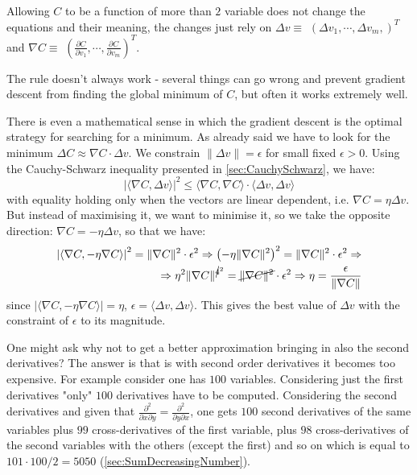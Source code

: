 \documentclass[12pt, letterpaper]{article}
\theoremstyle{definition}
\begin{document}
Allowing $C$ to be a function of more than $2$ variable does not change the equations and their meaning, the changes just rely on $\Delta v \equiv $ $\left( \Delta v_1, \cdots, \Delta v_m, \right)^T$ and $\nabla C \equiv$ $\left( \frac{\partial C}{\partial v_1}, \cdots, \frac{\partial C}{\partial v_m}\right)^T$.

The rule doesn't always work - several things can go wrong and prevent gradient descent from finding the global minimum of $C$, but often it works extremely well.

There is even a mathematical sense in which the gradient descent is the optimal strategy for searching for a minimum. As already said we have to look for the minimum $\Delta C \approx \nabla C  \cdot \Delta v$. We constrain $\| \Delta v \| = \epsilon$ for small fixed  $\epsilon > 0$. Using the Cauchy-Schwarz inequality presented in \autoref{sec:CauchySchwarz}, we have:
\begin{equation}
\left| \langle \nabla C, \Delta v \rangle \right|^2 \le \langle \nabla C, \nabla C \rangle\cdot \langle \Delta v, \Delta v \rangle 
\end{equation}
with equality holding only when  the vectors are linear dependent, i.e. $\nabla C = \eta \Delta v$. But instead of maximising it, we want to minimise it, so we take the opposite direction: $\nabla C = -\eta \Delta v$, so that we have:
\begin{equation}
\begin{aligned}
\left| \langle  \nabla C, -\eta  \nabla C \rangle \right|^2 = \|\nabla C\|^2 \cdot \epsilon^2 
\Rightarrow \left( -\eta \|\nabla C\|^2\right)^2 =\|\nabla C\|^2 \cdot \epsilon^2 \Rightarrow \\
\Rightarrow \eta^2 \|\nabla C\|^{\cancel{4}^2} = \cancel{\|\nabla C\|^2} \cdot \epsilon^2
\Rightarrow \eta = \frac{\epsilon}{\|\nabla C\|}
\end{aligned}
\end{equation}
since $\left| \langle  \nabla C, -\eta  \nabla C \rangle \right| = \eta $, $\epsilon = \langle \Delta v, \Delta v \rangle $. This gives the best value of $\Delta v$ with the constraint of $\epsilon$ to its magnitude.

One might ask why not to get a better approximation bringing in also the second derivatives? The answer is that is with second order derivatives it becomes too expensive. For example consider one has $100$ variables. Considering just the first derivatives "only" $100$ derivatives have to be computed. Considering the second derivatives and given that $\frac{\partial^2}{\partial x \partial y} =  \frac{\partial^2}{ \partial y\partial x}$, one gets $100$ second derivatives of the same variables plus $99$ cross-derivatives of the first variable, plus $98$ cross-derivatives of the second variables with the others (except the first) and so on which is equal to $101\cdot 100 /2 = 5050$ (\autoref{sec:SumDecreasingNumber}).
\end{document}
